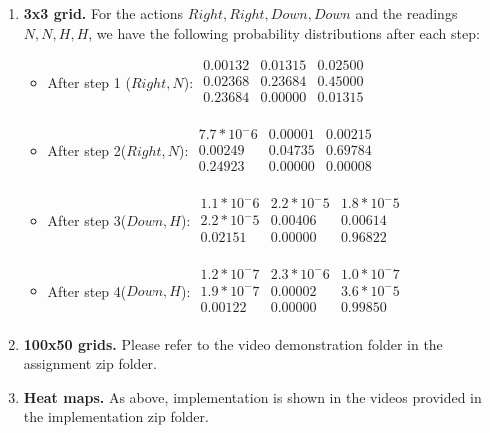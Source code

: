 \documentclass[12pt]{article}
\begin{document}
\begin{enumerate}[label=(\alph*)] 
    \item \textbf{3x3 grid.} For the actions {$Right, Right, Down, Down$} and the readings {$N, N, H, H$}, we have the following probability distributions after each step:
        \begin{itemize}
            \item After step 1 ($Right, N$):
            $\begin{matrix}
                0.00132 & 0.01315 & 0.02500 \\ 
                0.02368 & 0.23684 & 0.45000 \\ 
                0.23684 & 0.00000 & 0.01315\\
            \end{matrix}$
            \item After step 2($Right, N$):
            $\begin{matrix}
                7.7*10^-6 & 0.00001 & 0.00215 \\ 
                0.00249 & 0.04735 & 0.69784 \\ 
                0.24923 & 0.00000 & 0.00008\\
            \end{matrix}$
            \item After step 3($Down, H$):
            $\begin{matrix}
                1.1*10^-6 & 2.2*10^-5 & 1.8*10^-5 \\ 
                2.2*10^-5 & 0.00406 & 0.00614 \\ 
                0.02151 & 0.00000 & 0.96822 \\
            \end{matrix}$
            \item After step 4($Down, H$):
            $\begin{matrix}
                1.2*10^-7 & 2.3*10^-6 & 1.0*10^-7 \\ 
                1.9*10^-7 & 0.00002 & 3.6*10^-5 \\ 
                0.00122 & 0.00000 & 0.99850 \\
            \end{matrix}$
        \end{itemize}
    \item \textbf{100x50 grids.} Please refer to the video demonstration folder in the assignment zip folder.

    \item \textbf{Heat maps.} As above, implementation is shown in the videos provided in the implementation zip folder.
    
\end{enumerate}
\end{document}
